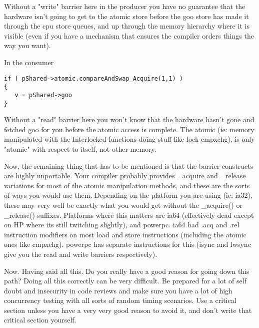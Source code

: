 Without a "write" barrier here in the producer you have no guarantee that the hardware isn't going to get to the atomic store before the goo store has made it through the cpu store queues, and up through the memory hierarchy where it is visible (even if you have a mechanism that ensures the compiler orders things the way you want).

In the consumer

\begin{lstlisting}
if ( pShared->atomic.compareAndSwap_Acquire(1,1) )
{
   v = pShared->goo 
}
\end{lstlisting}

Without a "read" barrier here you won't know that the hardware hasn't gone and fetched goo for you before the atomic access is complete. The atomic (ie: memory manipulated with the Interlocked functions doing stuff like lock cmpxchg), is only "atomic" with respect to itself, not other memory.

Now, the remaining thing that has to be mentioned is that the barrier constructs are highly unportable. Your compiler probably provides \_acquire and \_release variations for most of the atomic manipulation methods, and these are the sorts of ways you would use them. Depending on the platform you are using (ie: ia32), these may very well be exactly what you would get without the \_acquire() or \_release() suffixes. Platforms where this matters are ia64 (effectively dead except on HP where its still twitching slightly), and powerpc. ia64 had .acq and .rel instruction modifiers on most load and store instructions (including the atomic ones like cmpxchg). powerpc has separate instructions for this (isync and lwsync give you the read and write barriers respectively).

Now. Having said all this. Do you really have a good reason for going down this path? Doing all this correctly can be very difficult. Be prepared for a lot of self doubt and insecurity in code reviews and make sure you have a lot of high concurrency testing with all sorts of random timing scenarios. Use a critical section unless you have a very very good reason to avoid it, and don't write that critical section yourself.


\EndArticle
